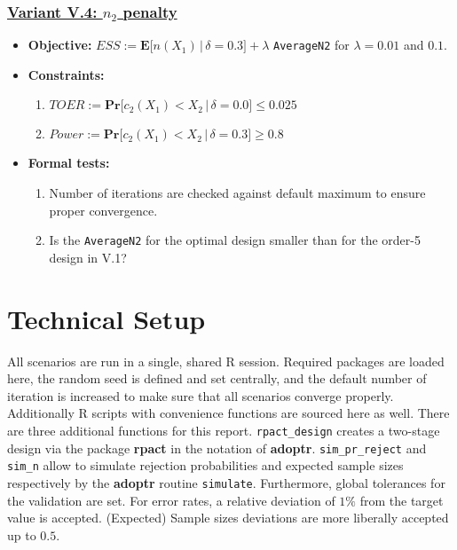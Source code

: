 \documentclass[]{book}
\providecommand{\tightlist}{%
  \setlength{\itemsep}{0pt}\setlength{\parskip}{0pt}}
\begin{document}
\hypertarget{variant-v.4-n_2-penalty}{%
\subsubsection{\texorpdfstring{\protect\hyperlink{variantV_4}{Variant V.4: \(n_2\) penalty}}{Variant V.4: n\_2 penalty}}\label{variant-v.4-n_2-penalty}}

\begin{itemize}
\tightlist
\item
  \textbf{Objective:} \(ESS := \boldsymbol{E}\big[n(X_1)\,|\,\delta=0.3\big] + \lambda\) \texttt{AverageN2}
  for \(\lambda = 0.01\) and \(0.1\).
\item
  \textbf{Constraints:}

  \begin{enumerate}
  \def\labelenumi{\arabic{enumi}.}
  \tightlist
  \item
    \(TOER := \boldsymbol{Pr}\big[c_2(X_1) < X_2\,|\,\delta=0.0\big] \leq 0.025\)
  \item
    \(Power := \boldsymbol{Pr}\big[c_2(X_1) < X_2\,|\,\delta=0.3\big] \geq 0.8\)
  \end{enumerate}
\item
  \textbf{Formal tests:}

  \begin{enumerate}
  \def\labelenumi{\arabic{enumi}.}
  \tightlist
  \item
    Number of iterations are checked against default maximum to ensure proper
    convergence.
  \item
    Is the \texttt{AverageN2} for the optimal design smaller than for the order-5
    design in V.1?
  \end{enumerate}
\end{itemize}

\hypertarget{technical-setup}{%
\section{Technical Setup}\label{technical-setup}}

All scenarios are run in a single, shared R session.
Required packages are loaded here,
the random seed is defined and set centrally, and the default number
of iteration is increased to make sure that all scenarios
converge properly.
Additionally R scripts with convenience functions are sourced here as well.
There are three additional functions for this report.
\texttt{rpact\_design} creates a two-stage design via the package \textbf{rpact} \citep{R-rpact}
in the notation of \textbf{adoptr}.
\texttt{sim\_pr\_reject} and \texttt{sim\_n} allow to simulate rejection probabilities
and expected sample sizes respectively by the \textbf{adoptr} routine \texttt{simulate}.
Furthermore, global tolerances for the validation are set.
For error rates, a relative deviation of \(1\%\) from the target value is
accepted.
(Expected) Sample sizes deviations are more liberally accepted up to \(0.5\).
\end{document}
